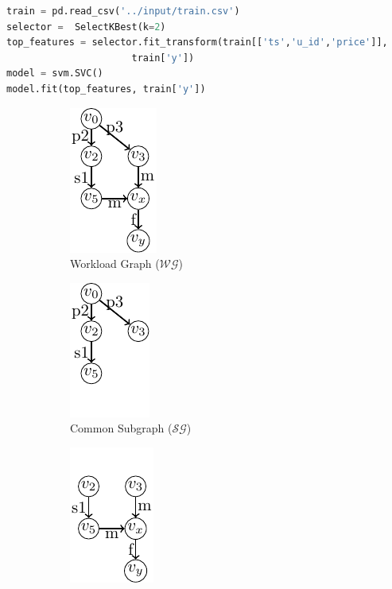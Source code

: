 \begin{lstlisting}[language=Python, firstnumber = 8,caption=New workload script (Imports are omitted),captionpos=b,label = {listing-reuse}]
train = pd.read_csv('../input/train.csv') 
selector =  SelectKBest(k=2)
top_features = selector.fit_transform(train[['ts','u_id','price']], 
				      train['y'])
model = svm.SVC()
model.fit(top_features, train['y'])
\end{lstlisting}

\begin{figure}
\captionsetup[subfigure]{justification=centering}
\begin{subfigure}[t]{0.33\linewidth}
\centering
\includegraphics{../images/tikz-standalone/reuse-example-wg}
\caption{Workload Graph ($\mathcal{WG}$)}
\end{subfigure}%
\begin{subfigure}[t]{0.33\linewidth}
\centering
\includegraphics{../images/tikz-standalone/reuse-example-sg}
\caption{Common Subgraph ($\mathcal{SG}$)}
\end{subfigure}%
\begin{subfigure}[t]{0.33\linewidth}
\centering
\includegraphics{../images/tikz-standalone/reuse-example-final}

\end{subfigure}
\end{figure}
